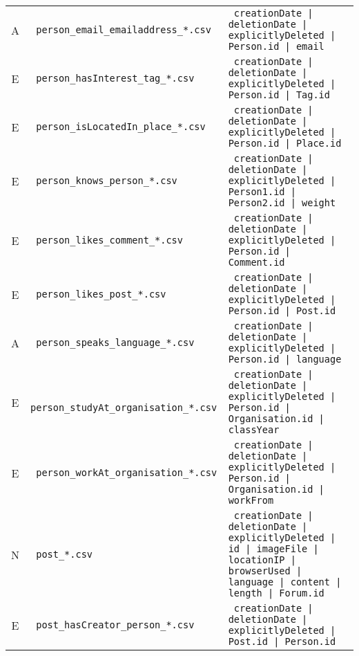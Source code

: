 \begin{table}[htb]
\begin{tabularx}{\linewidth}{|>{\sffamily}c|>{\tt}l|>{\tt}X|}
        A                    & person\_email\_emailaddress\_*.csv      & creationDate | deletionDate | explicitlyDeleted | Person.id | email                                                                  \\
        E                    & person\_hasInterest\_tag\_*.csv         & creationDate | deletionDate | explicitlyDeleted | Person.id | Tag.id                                                                 \\
        E                    & person\_isLocatedIn\_place\_*.csv       & creationDate | deletionDate | explicitlyDeleted | Person.id | Place.id                                                               \\
        E                    & person\_knows\_person\_*.csv            & creationDate | deletionDate | explicitlyDeleted | Person1.id | Person2.id | weight                                                   \\
        E                    & person\_likes\_comment\_*.csv           & creationDate | deletionDate | explicitlyDeleted | Person.id | Comment.id                                                             \\
        E                    & person\_likes\_post\_*.csv              & creationDate | deletionDate | explicitlyDeleted | Person.id | Post.id                                                                \\
        A                    & person\_speaks\_language\_*.csv         & creationDate | deletionDate | explicitlyDeleted | Person.id | language                                                               \\
        E                    & person\_studyAt\_organisation\_*.csv    & creationDate | deletionDate | explicitlyDeleted | Person.id | Organisation.id | classYear                                            \\
        E                    & person\_workAt\_organisation\_*.csv     & creationDate | deletionDate | explicitlyDeleted | Person.id | Organisation.id | workFrom                                             \\
        \hline
        N                    & post\_*.csv                             & creationDate | deletionDate | explicitlyDeleted | id | imageFile | locationIP | browserUsed | language | content | length | Forum.id \\
        E                    & post\_hasCreator\_person\_*.csv         & creationDate | deletionDate | explicitlyDeleted | Post.id | Person.id                                                                \\

\end{tabularx}
\end{table}
